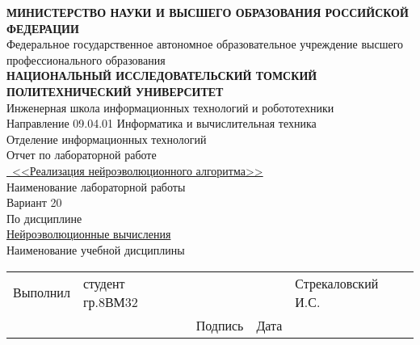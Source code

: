 \documentclass[12pt]{extarticle}
\begin{document}
\begin{titlepage}
    \centering
    
    {\bfseries\Large МИНИСТЕРСТВО НАУКИ И ВЫСШЕГО ОБРАЗОВАНИЯ РОССИЙСКОЙ ФЕДЕРАЦИИ\\}
    \vspace{0.5cm}
    {\large Федеральное государственное автономное образовательное учреждение высшего профессионального образования\\}
    \vspace{0.5cm}
    {\bfseries\Large НАЦИОНАЛЬНЫЙ ИССЛЕДОВАТЕЛЬСКИЙ ТОМСКИЙ ПОЛИТЕХНИЧЕСКИЙ УНИВЕРСИТЕТ\\}
    \vspace{0.5cm}
    {\large Инженерная школа информационных технологий и робототехники\\}
    {\large Направление 09.04.01 Информатика и вычислительная техника\\}
    {\large Отделение информационных технологий\\}
    \vspace{1cm}
    {\large Отчет по лабораторной работе\\}
    \vspace{0.5cm}
    {\large\underline{\ <<Реализация нейроэволюционного алгоритма>>}\\}
    \vspace{0.1cm}
    {\small Наименование лабораторной работы\\}
    \vspace{0.5cm}
    {\large Вариант 20\\}
    \vspace{0.5cm}
    {\large По дисциплине \\}
    \vspace{0.5cm}
    {\large\underline{Нейроэволюционные вычисления}\\}
    \vspace{0.1cm}
    {\small Наименование учебной дисциплины\\}
    \vspace{2cm}

    \begin{tabular}{p{3cm} p{4cm} p{2cm} p{2cm} p{4cm} }
        Выполнил & студент гр.8ВМ32 & \hrulefill & \hrulefill & Стрекаловский И.С. \\
         &  & \centering\small Подпись & \centering\small Дата &  \\
    \end{tabular}


\end{titlepage}
\end{document}
